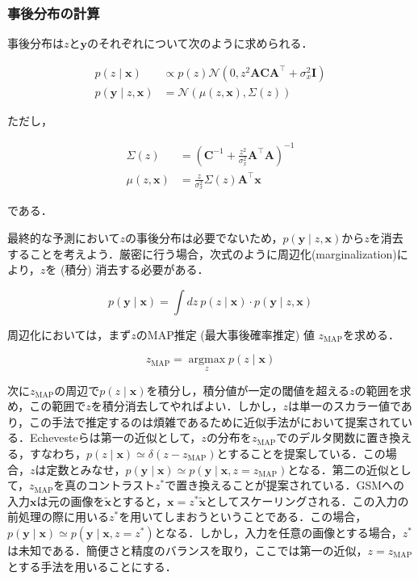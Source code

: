 \subsubsection{事後分布の計算}
事後分布は$z$と$\mathbf{y}$のそれぞれについて次のように求められる．



\begin{align}
p(z \mid \mathbf{x}) &\propto p(z) \mathcal{N}\left(0, z^{2} \mathbf{A C A}^{\top}+\sigma_{x}^{2} \mathbf{I}\right)\\
p(\mathbf{y} \mid z, \mathbf{x})& = \mathcal{N}\left(\mu(z, \mathbf{x}), \Sigma(z)\right)
\end{align}


ただし，


\begin{align}
\Sigma(z)&=\left(\mathbf{C}^{-1}+\frac{z^{2}}{\sigma_{x}^{2}} \mathbf{A}^{\top} \mathbf{A}\right)^{-1}\\
\mu(z, \mathbf{x})&=\frac{z}{\sigma_{x}^{2}} \Sigma(z) \mathbf{A}^{\top} \mathbf{x}
\end{align}


である．

最終的な予測において$z$の事後分布は必要でないため，$p(\mathbf{y} \mid z, \mathbf{x})$から$z$を消去することを考えよう．厳密に行う場合，次式のように周辺化(marginalization)により，$z$を (積分) 消去する必要がある．


\begin{equation}
p(\mathbf{y} \mid \mathbf{x}) = \int dz\ p(z\mid \mathbf{x})\cdot p(\mathbf{y} \mid z, \mathbf{x})
\end{equation}


周辺化においては，まず$z$のMAP推定 (最大事後確率推定) 値 $z_{\mathrm{MAP}}$を求める．


\begin{equation}
z_{\mathrm{MAP}} = \underset{z}{\operatorname{argmax}} p(z\mid \mathbf{x})
\end{equation}


次に$z_{\mathrm{MAP}}$の周辺で$p(z\mid \mathbf{x})$を積分し，積分値が一定の閾値を超える$z$の範囲を求め，この範囲で$z$を積分消去してやればよい．しかし，$z$は単一のスカラー値であり，この手法で推定するのは煩雑であるために近似手法が\cite{Echeveste2017-wu}において提案されている．Echevesteらは第一の近似として，$z$の分布を$z_{\mathrm{MAP}}$でのデルタ関数に置き換える，すなわち，$p(z\mid \mathbf{x})\simeq \delta (z-z_{\mathrm{MAP}})$とすることを提案している．この場合，$z$は定数とみなせ，$p(\mathbf{y} \mid \mathbf{x})\simeq p(\mathbf{y} \mid \mathbf{x}, z=z_{\mathrm{MAP}})$となる．第二の近似として，$z_{\mathrm{MAP}}$を真のコントラスト$z^*$で置き換えることが提案されている．GSMへの入力$\mathbf{x}$は元の画像を$\mathbf{\tilde x}$とすると，$\mathbf{x}=z^* \mathbf{\tilde x}$としてスケーリングされる．この入力の前処理の際に用いる$z^*$を用いてしまおうということである．この場合，$p(\mathbf{y} \mid \mathbf{x})\simeq p(\mathbf{y} \mid \mathbf{x}, z=z^*)$となる．しかし，入力を任意の画像とする場合，$z^*$は未知である．簡便さと精度のバランスを取り，ここでは第一の近似，$z=z_{\mathrm{MAP}}$とする手法を用いることにする．
